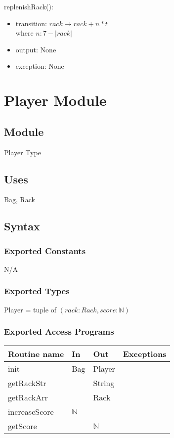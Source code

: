 \documentclass[12pt]{article}
\begin{document}
\noindent replenishRack():
\begin{itemize}
\item transition: $rack \rightarrow rack + n*t$ \\
        where $n : 7 - |rack|$
\item output: None
\item exception: None
\end{itemize}
\medskip
\newpage

\section* {Player Module}

\subsection*{Module}

Player Type

\subsection* {Uses}

Bag, Rack

\subsection* {Syntax}

\subsubsection* {Exported Constants}
N/A
\subsubsection* {Exported Types}

Player = tuple of $(rack: Rack, score:\mathbb{N})$

\subsubsection* {Exported Access Programs}

\begin{tabular}{| l | l | l | l |}
\hline
\textbf{Routine name} & \textbf{In} & \textbf{Out} & \textbf{Exceptions}\\
\hline
init & Bag & Player &  \\
\hline
getRackStr & & String & \\
\hline
getRackArr & & Rack & \\
\hline
increaseScore & $\mathbb{N}$ &  & \\
\hline
getScore & & $\mathbb{N}$ & \\
\hline
\end{tabular}
\end{document}
